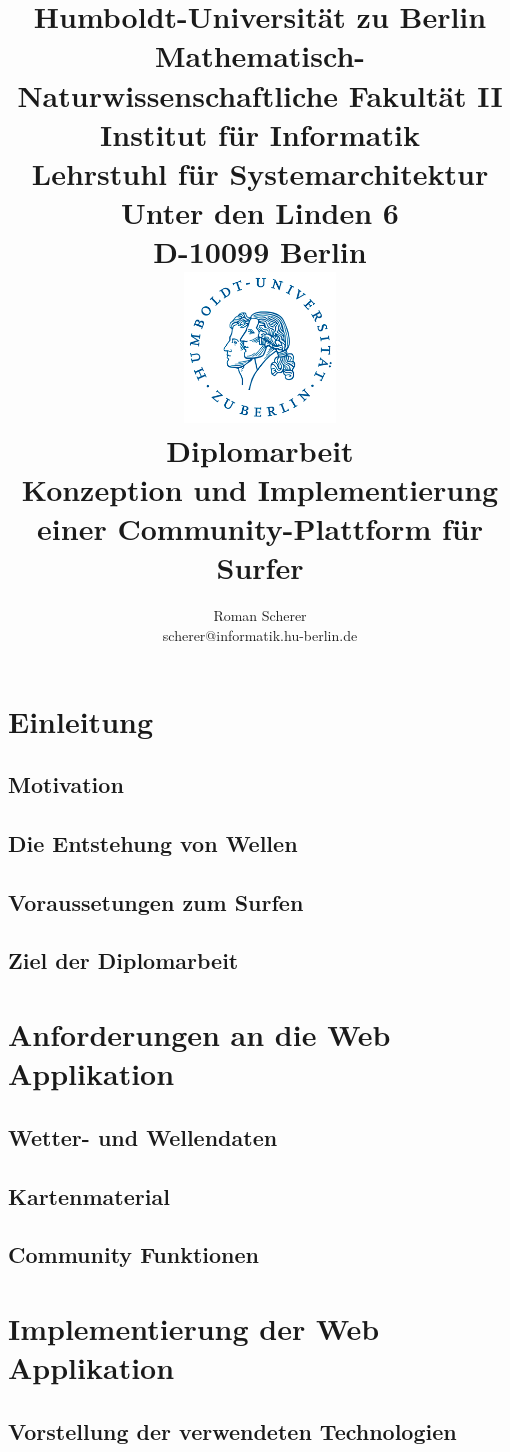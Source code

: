 \documentclass[12pt,a4paper,ngerman]{report}
\author{Roman Scherer \\ scherer@informatik.hu-berlin.de}
\title{{\small
    Humboldt-Universität zu Berlin \\
    Mathematisch-Naturwissenschaftliche Fakultät II \\
    Institut für Informatik \\
    Lehrstuhl für Systemarchitektur \\
    Unter den Linden 6 \\
    D-10099 Berlin \\
  } \vspace{0.4cm}
  \includegraphics[width=4cm]{bilder/husiegel_bw} \\
  \vspace{0.4cm}
  \large{Diplomarbeit} \\
  \LARGE{\textbf{Konzeption und Implementierung einer Community-Plattform für Surfer}} \\
}
\begin{document}
\maketitle

%

\tableofcontents

%
%

\chapter{Einleitung}
\section{Motivation}
\section{Die Entstehung von Wellen}
\section{Voraussetungen zum Surfen}
\section{Ziel der Diplomarbeit}

\chapter{Anforderungen an die Web Applikation}
\section{Wetter- und Wellendaten}
\section{Kartenmaterial}
\section{Community Funktionen}

\chapter{Implementierung der Web Applikation}
\section{Vorstellung der verwendeten Technologien}
\end{document}

